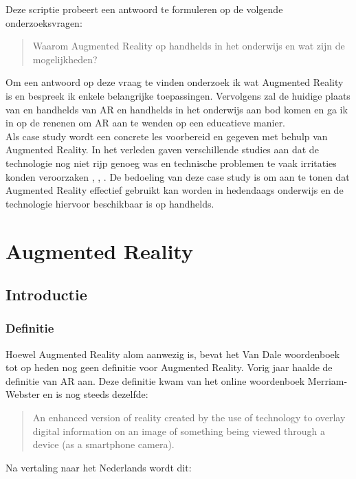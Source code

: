 \documentclass[pdftex,a4paper,12pt,twoside]{report}
\begin{document}
Deze scriptie probeert een antwoord te formuleren op de volgende onderzoeksvragen:

\begin{quote}
Waarom Augmented Reality op handhelds in het onderwijs en wat zijn de mogelijkheden? 
\end{quote}

Om een antwoord op deze vraag te vinden onderzoek ik wat Augmented Reality is en bespreek ik enkele belangrijke toepassingen. Vervolgens zal de huidige plaats van en handhelds van AR en handhelds in het onderwijs aan bod komen en ga ik in op de renenen om AR aan te wenden op een educatieve manier. \\

Als case study wordt een concrete les voorbereid en gegeven met behulp van Augmented Reality. In het verleden gaven verschillende studies aan dat de technologie nog niet rijp genoeg was en technische problemen te vaak irritaties konden veroorzaken \citep{aredu}, \citep{dunleavy2009affordances}, \citep{kerawalla2006}. De bedoeling van deze case study is om aan te tonen dat Augmented Reality effectief gebruikt kan worden in hedendaags onderwijs en de technologie hiervoor beschikbaar is op handhelds.  
\chapter{Augmented Reality}
\label{ch:AR}

\section{Introductie}
\subsection{Definitie}
\label{sec:def}
Hoewel Augmented Reality alom aanwezig is, bevat het Van Dale woordenboek tot op heden nog geen definitie voor Augmented Reality.  Vorig jaar haalde \cite{degrande} de definitie van AR aan. Deze definitie kwam van het online woordenboek Merriam-Webster \citep{merriam} en is nog steeds dezelfde:

 \begin{quote}
  An enhanced version of reality created by the use of technology to overlay digital information on an image of something being viewed through a device (as a smartphone camera).
 \end{quote}

Na vertaling naar het Nederlands wordt dit:
\end{document}
